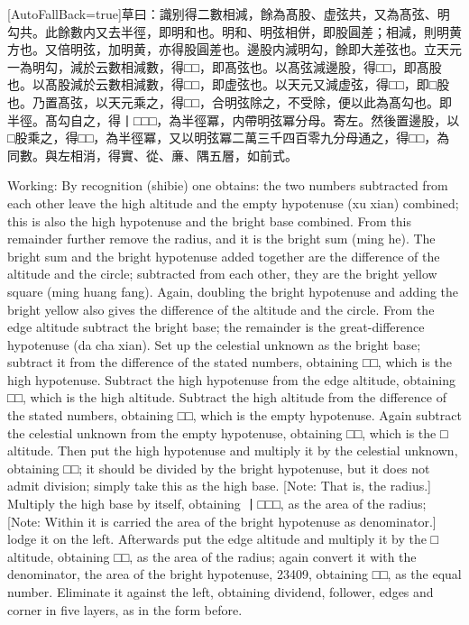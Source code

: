 \documentclass[11pt]{article}
\newcommand{\zhsmall}{\footnotesize\color{black!70}}
\newcommand{\unitlabel}[1]{\marginpar{\raggedleft\tiny\color{gray}#1}}
\newenvironment{unitzh}{\par\CJKfontspec{Noto Serif CJK SC}[AutoFallBack=true]\large\linespread{1.25}\selectfont}{\par}
\newenvironment{uniten}{\par\small\color{black!85}}{\par\medskip}
\begin{document}
\begin{unitzh}\unitlabel{ceyuan-009.21}草曰：識别得二數相減，餘為髙股、虚弦共，又為髙弦、明勾共。此餘數内又去半徑，即明和也。明和、明弦相併，即股圓差；相減，則明黄方也。又倍明弦，加明黄，亦得股圓差也。邊股内減明勾，餘即大差弦也。立天元一為明勾，減於云數相減數，得□□，即髙弦也。以髙弦減邊股，得□□，即髙股也。以髙股減於云數相減數，得□□，即虚弦也。以天元又減虚弦，得□□，即□股也。乃置髙弦，以天元乘之，得□□，合明弦除之，不受除，便以此為髙勾也。{\zhsmall 即半徑。}髙勾自之，得丨□□□，為半徑冪，{\zhsmall 内帶明弦冪分母。}寄左。然後置邊股，以□股乘之，得□□，為半徑冪，又以明弦冪二萬三千四百零九分母通之，得□□，為同數。與左相消，得實、從、亷、隅五層，如前式。\end{unitzh}
\begin{uniten}Working: By recognition (shibie) one obtains: the two numbers subtracted from each other leave the high altitude and the empty hypotenuse (xu xian) combined; this is also the high hypotenuse and the bright base combined. From this remainder further remove the radius, and it is the bright sum (ming he). The bright sum and the bright hypotenuse added together are the difference of the altitude and the circle; subtracted from each other, they are the bright yellow square (ming huang fang). Again, doubling the bright hypotenuse and adding the bright yellow also gives the difference of the altitude and the circle. From the edge altitude subtract the bright base; the remainder is the great-difference hypotenuse (da cha xian). Set up the celestial unknown as the bright base; subtract it from the difference of the stated numbers, obtaining □□, which is the high hypotenuse. Subtract the high hypotenuse from the edge altitude, obtaining □□, which is the high altitude. Subtract the high altitude from the difference of the stated numbers, obtaining □□, which is the empty hypotenuse. Again subtract the celestial unknown from the empty hypotenuse, obtaining □□, which is the □ altitude. Then put the high hypotenuse and multiply it by the celestial unknown, obtaining □□; it should be divided by the bright hypotenuse, but it does not admit division; simply take this as the high base. [Note: That is, the radius.] Multiply the high base by itself, obtaining 丨□□□, as the area of the radius; [Note: Within it is carried the area of the bright hypotenuse as denominator.] lodge it on the left. Afterwards put the edge altitude and multiply it by the □ altitude, obtaining □□, as the area of the radius; again convert it with the denominator, the area of the bright hypotenuse, 23409, obtaining □□, as the equal number. Eliminate it against the left, obtaining dividend, follower, edges and corner in five layers, as in the form before.\end{uniten}
\end{document}
